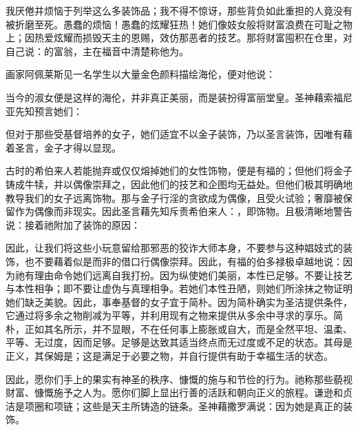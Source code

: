 我厌倦并烦恼于列举这么多装饰品；我不得不惊讶，那些背负如此重担的人竟没有被折磨至死。愚蠢的烦恼！愚蠢的炫耀狂热！她们像妓女般将财富浪费在可耻之物上；因热爱炫耀而损毁天主的恩赐，效仿那恶者的技艺。那将财富囤积在仓里，对自己说：的富翁，主在福音中清楚称他为。\par

画家阿佩莱斯见一名学生以大量金色颜料描绘海伦，便对他说：\par

当今的淑女便是这样的海伦，并非真正美丽，而是装扮得富丽堂皇。圣神藉索福尼亚先知预言她们：\par

但对于那些受基督培养的女子，她们适宜不以金子装饰，乃以圣言装饰，因唯有藉着圣言，金子才得以显现。\par

古时的希伯来人若能抛弃或仅仅熔掉她们的女性饰物，便是有福的；但他们将金子铸成牛犊，并以偶像崇拜之，因此他们的技艺和企图均无益处。但他们极其明确地教导我们的女子远离饰物。那与金子行淫的贪欲成为偶像，且受火试验；奢靡被保留作为偶像而非现实。因此圣言藉先知斥责希伯来人：，即饰物。且极清晰地警告说：接着祂附加了装饰的原因：\par

因此，让我们将这些小玩意留给那邪恶的狡诈大师本身，不要参与这种娼妓式的装饰，也不要藉着似是而非的借口行偶像崇拜。因此，有福的伯多禄极卓越地说：因为祂有理由命令她们远离自我打扮。因为纵使她们美丽，本性已足够。不要让技艺与本性相争；即不要让虚伪与真理相争。若她们本性丑陋，则她们所涂抹之物证明她们缺乏美貌。因此，事奉基督的女子宜于简朴。因为简朴确实为圣洁提供条件，它通过将多余之物削减为平等，并利用现有之物来提供从多余中寻求的享乐。简朴，正如其名所示，并不显眼，不在任何事上膨胀或自大，而是全然平坦、温柔、平等、无过度，因而足够。足够是达致其适当终点而无过度或不足的状态。其母是正义，其保姆是；这是满足于必要之物，并自行提供有助于幸福生活的状态。\par

因此，愿你们手上的果实有神圣的秩序、慷慨的施与和节俭的行为。祂称那些藐视财富、慷慨施予之人为。愿你们脚上显出行善的活跃和朝向正义的旅程。谦逊和贞洁是项圈和项链；这些是天主所铸造的链条。圣神藉撒罗满说：因为她是真正的装饰。\par

